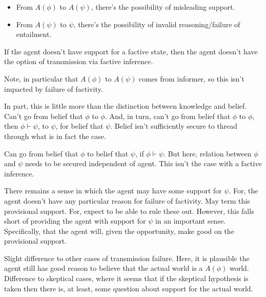 \documentclass[10pt]{article}
\begin{document}
\begin{note}
  \begin{itemize}
  \item From \(A(\phi)\) to \(A(\psi)\), there's the possibility of misleading support.
  \item From \(A(\psi)\) to \(\psi\), there's the possibility of invalid reasoning/failure of entailment.
  \end{itemize}
  If the agent doesn't have support for a factive state, then the agent doesn't have the option of transmission via factive inference.

  Note, in particular that \(A(\phi)\) to \(A(\psi)\) comes from informer, so this isn't impacted by failure of factivity.

  In part, this is little more than the distinction between knowledge and belief.
  Can't go from belief that \(\phi\) to \(\phi\).
  And, in turn, can't go from belief that \(\phi\) to \(\phi\), then \(\phi \vdash \psi\), to \(\psi\), for belief that \(\psi\).
  Belief isn't sufficiently secure to thread through what is in fact the case.

  Can go from belief that \(\phi\) to belief that \(\psi\), if \(\phi \vdash \psi\).
  But here, relation between \(\phi\) and \(\psi\) needs to be secured independent of agent.
  This isn't the case with a factive inference.

  There remains a sense in which the agent may have some support for \(\psi\).
  For, the agent doesn't have any particular reason for failure of factivity.
  May term this provisional support.
  For, expect to be able to rule these out.
  However, this falls short of providing the agent with support for \(\psi\) in an important sense.
  Specifically, that the agent will, given the opportunity, make good on the provisional support.

  Slight difference to other cases of transmission failure.
  Here, it is plausible the agent still has good reason to believe that the actual world is a \(A(\phi)\) world.
  Difference to skeptical cases, where it seems that if the skeptical hypothesis is taken then there is, at least, some question about support for the actual world.
\end{note}
\end{document}
